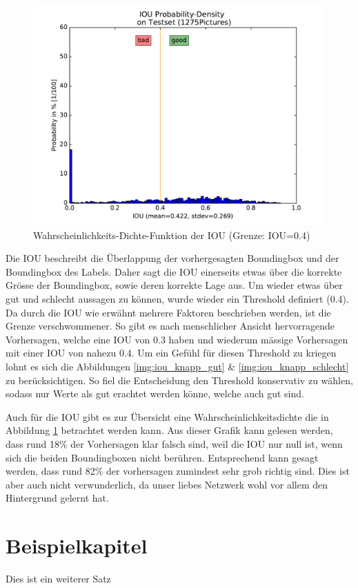\documentclass[a4paper,12pt]{article}
\begin{document}
\begin{figure}
	\centering
	\includegraphics[width=.7\textwidth]{BilderResultate/IOUprobDensity.pdf}
	\caption{Wahrscheinlichkeits-Dichte-Funktion der IOU (Grenze: IOU=0.4)}
	\label{img:iou_dichte}
\end{figure}
Die IOU beschreibt die Überlappung der vorhergesagten Boundingbox und der Boundingbox des Labels. 
Daher sagt die IOU einerseits etwas über die korrekte Grösse der Boundingbox, sowie deren korrekte Lage aus. 
Um wieder etwas über gut und schlecht aussagen zu können, wurde wieder ein Threshold definiert (0.4).
Da durch die IOU wie erwähnt mehrere Faktoren beschrieben werden, ist die Grenze verschwommener. 
So gibt es nach menschlicher Ansicht hervorragende Vorhersagen, welche eine IOU von 0.3 haben und wiederum mässige Vorhersagen mit einer IOU von nahezu 0.4.
Um ein Gefühl für diesen Threshold zu kriegen lohnt es sich die Abbildungen \ref{img:iou_knapp_gut} \& \ref{img:iou_knapp_schlecht} zu berücksichtigen.
So fiel die Entscheidung den Threshold konservativ zu wählen, sodass nur Werte als gut erachtet werden könne, welche auch gut sind. 

Auch für die IOU gibt es zur Übersicht eine Wahrscheinlichkeitsdichte die in Abbildung \ref{img:iou_dichte} betrachtet werden kann.
Aus dieser Grafik kann gelesen werden, dass rund 18\% der Vorhersagen klar falsch sind, weil die IOU nur null ist, wenn sich die beiden Boundingboxen nicht berühren. Entsprechend kann gesagt werden, dass rund 82\% der vorhersagen zumindest sehr grob richtig sind. 
Dies ist aber auch nicht verwunderlich, da unser liebes Netzwerk wohl vor allem den Hintergrund gelernt hat.

\newpage
\section{Beispielkapitel}
Dies ist ein weiterer Satz
\end{document}
